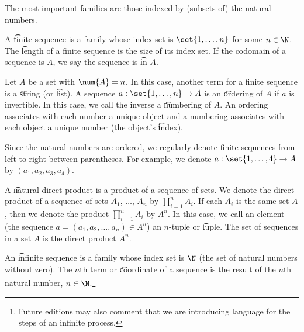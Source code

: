 

The most important families are those indexed by (subsets of) the natural numbers.


A \t{finite sequence} is a family whose index set is $\set{1, \dots, n}$ for some $n \in \N$.
The \t{length} of a finite sequence is the size of its index set.
If the codomain of a sequence is $A$, we say the sequence is \t{in} $A$.

Let $A$ be a set with $\num{A} = n$.
In this case, another term for a finite sequence is a \t{string} (or \t{list}).
A sequence $a: \set{1, \dots, n} \to A$ is an \t{ordering} of $A$ if $a$ is invertible.
In this case, we call the inverse a \t{numbering} of $A$.
An ordering associates with each number a unique object and a numbering associates with each object a unique number (the object's \t{index}).


Since the natural numbers are ordered, we regularly denote finite sequences from left to right between parentheses.
For example, we denote $a: \set{1, \dots, 4} \to A$ by $(a_1, a_2, a_3, a_4)$.


A \t{natural direct product} is a product of a sequence of sets.
We denote the direct product of a sequence of sets $A_1$, $\dots$, $A_n$ by $\prod_{i = 1}^{n} A_i$.
If each $A_i$ is the same set $A$, then we denote the product $\prod_{i = 1}^{n} A_i$ by $A^n$.
In this case, we call an element (the sequence $a = (a_1, a_2, \dots, a_n) \in A^n$) an \t{$n$-tuple} or \t{tuple}.
The set of sequences in a set $A$ is the direct product $A^n$.


An \t{infinite sequence} is a family whose index set is $\N$ (the set of natural numbers without zero).
The \t{$n$th term} or \t{coordinate} of a sequence is the result of the $n$th natural number, $n \in \N$.\footnote{Future editions may also comment that we are introducing language for the steps of an infinite process.}

